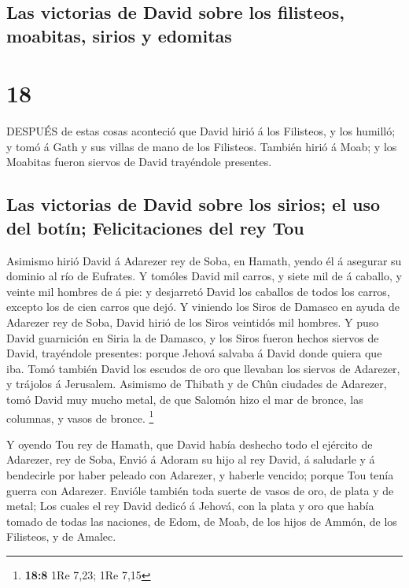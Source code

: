 \hypertarget{las-victorias-de-david-sobre-los-filisteos-moabitas-sirios-y-edomitas}{%
\subsection{Las victorias de David sobre los filisteos, moabitas, sirios
y
edomitas}\label{las-victorias-de-david-sobre-los-filisteos-moabitas-sirios-y-edomitas}}

\hypertarget{section-17}{%
\section{18}\label{section-17}}

 DESPUÉS de estas cosas aconteció que David hirió á los
Filisteos, y los humilló; y tomó á Gath y sus villas de mano de los
Filisteos.  También hirió á Moab; y los Moabitas fueron
siervos de David trayéndole presentes.

\hypertarget{las-victorias-de-david-sobre-los-sirios-el-uso-del-botuxedn-felicitaciones-del-rey-tou}{%
\subsection{Las victorias de David sobre los sirios; el uso del botín;
Felicitaciones del rey
Tou}\label{las-victorias-de-david-sobre-los-sirios-el-uso-del-botuxedn-felicitaciones-del-rey-tou}}

 Asimismo hirió David á Adarezer rey de Soba, en Hamath,
yendo él á asegurar su dominio al río de Eufrates.  Y
tomóles David mil carros, y siete mil de á caballo, y veinte mil hombres
de á pie: y desjarretó David los caballos de todos los carros, excepto
los de cien carros que dejó.  Y viniendo los Siros de
Damasco en ayuda de Adarezer rey de Soba, David hirió de los Siros
veintidós mil hombres.  Y puso David guarnición en Siria la
de Damasco, y los Siros fueron hechos siervos de David, trayéndole
presentes: porque Jehová salvaba á David donde quiera que iba.
 Tomó también David los escudos de oro que llevaban los
siervos de Adarezer, y trájolos á Jerusalem.  Asimismo de
Thibath y de Chûn ciudades de Adarezer, tomó David muy mucho metal, de
que Salomón hizo el mar de bronce, las columnas, y vasos de bronce.
\footnote{\textbf{18:8} 1Re 7,23; 1Re 7,15}

 Y oyendo Tou rey de Hamath, que David había deshecho todo
el ejército de Adarezer, rey de Soba,  Envió á Adoram su
hijo al rey David, á saludarle y á bendecirle por haber peleado con
Adarezer, y haberle vencido; porque Tou tenía guerra con Adarezer.
Envióle también toda suerte de vasos de oro, de plata y de metal;
 Los cuales el rey David dedicó á Jehová, con la plata y
oro que había tomado de todas las naciones, de Edom, de Moab, de los
hijos de Ammón, de los Filisteos, y de Amalec.

